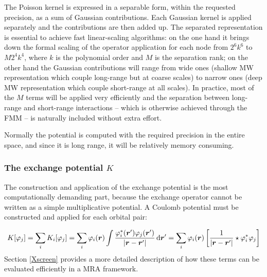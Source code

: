 \documentclass[journal=jctcce, manuscript=article]{achemso}
\begin{document}
The Poisson kernel is expressed in a separable form, within the requested precision, as a sum of Gaussian contributions.\cite{Beylkin.10.1016/j.acha.2005.01.003} Each Gaussian kernel is applied separately and the contributions are then added up. The separated representation is essential to achieve fast linear-scaling algorithms: on the one hand it brings down the formal scaling of the operator application for each node from $2^6 k^6$ to $M 2^4 k^4$, where $k$ is the polynomial order and $M$ is the separation rank; on the other hand the Gaussian contributions will range from wide ones (shallow \ac{MW} representation which couple long-range but at coarse scales) to narrow ones (deep \ac{MW} representation which couple short-range at all scales). In practice, most of the $M$ terms will be applied very efficiently and the separation between long-range and short-range interactions -- which is otherwise achieved through the \ac{FMM} -- is naturally included without extra effort.\cite{Frediani.10.1080/00268976.2013.810793, Beylkin.10.1016/j.acha.2007.01.001}

Normally the potential is computed with the required precision in the entire space, and since it is long range, it will be relatively memory consuming.

\subsubsection{The exchange potential $K$}\label{sec:compute-K}
The construction and application of the exchange potential is the most computationally demanding part, because the exchange operator cannot be written as a simple multiplicative potential. A Coulomb potential must be constructed and applied for each orbital pair:

\begin{equation}
  K[\varphi_j] = \sum_i K_i[\varphi_j] = 
  \sum_i \varphi_i(\boldsymbol{r}) \int \frac{\varphi^*_i(\boldsymbol{r}')\varphi_j(\boldsymbol{r}')}{|\boldsymbol{r}-\boldsymbol{r}'|} \, \mathrm{d}\boldsymbol{r}'
  =
  \sum_i \varphi_i(\boldsymbol{r}) \left[
  \frac{1}{|\boldsymbol{r}-\boldsymbol{r}'|} \star 
  \varphi^*_i\varphi_j
  \right]
\end{equation}
Section \ref{Xscreen} provides a more detailed description of how these terms can be evaluated efficiently in a \ac{MRA} framework. 
\end{document}
